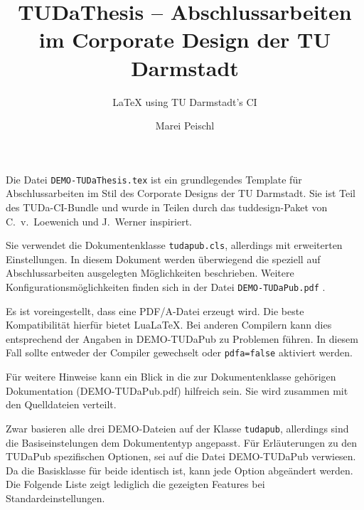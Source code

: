 \documentclass[
	german,%
	ruledheaders=section,%
	class=report,%
	thesis={type=bachelor},%
	fontsize=11pt,%
	parskip=half-,%
	custommargins=true,%
	marginpar=false,%
	accentcolor=9c,%
]{tudapub}
\title{TUDaThesis -- Abschlussarbeiten im Corporate Design der TU Darmstadt}
\subtitle{\LaTeX{} using TU Darmstadt's CI}
\author{Marei Peischl}
\institute{Institut}
\let\file\texttt
\let\code\texttt
\begin{document}
\maketitle


\tableofcontents


Die Datei \file{DEMO-TUDaThesis.tex} ist ein grundlegendes Template für Abschlussarbeiten im Stil des Corporate Designs der TU Darmstadt.
Sie ist Teil des TUDa-CI-Bundle und wurde in Teilen durch das tuddesign-Paket von C.~v.~Loewenich und J.~Werner inspiriert.

Sie verwendet die Dokumentenklasse \file{tudapub.cls}, allerdings mit erweiterten Einstellungen.
In diesem Dokument werden überwiegend die speziell auf Abschlussarbeiten ausgelegten Möglichkeiten beschrieben.
Weitere Konfigurationsmöglichkeiten finden sich in der Datei \file{DEMO-TUDaPub.pdf} \cite{tudapub}.

Es ist voreingestellt, dass eine PDF/A-Datei erzeugt wird.
Die beste Kompatibilität hierfür bietet Lua\LaTeX.
Bei anderen Compilern kann dies entsprechend der Angaben in DEMO-TUDaPub zu Problemen führen.
In diesem Fall sollte entweder der Compiler gewechselt oder \code{pdfa=false} aktiviert werden.

Für weitere Hinweise kann ein Blick in die zur Dokumentenklasse gehörigen Dokumentation (DEMO-TUDaPub.pdf) hilfreich sein.
Sie wird zusammen mit den Quelldateien verteilt.

Zwar basieren alle drei DEMO-Dateien auf der Klasse \code{tudapub}, allerdings sind die Basiseinstelungen dem Dokumententyp angepasst.
Für Erläuterungen zu den TUDaPub spezifischen Optionen, sei auf die Datei DEMO-TUDaPub verwiesen.
Da die Basisklasse für beide identisch ist, kann jede Option abgeändert werden.
Die Folgende Liste zeigt lediglich die gezeigten Features bei Standardeinstellungen.
\end{document}
